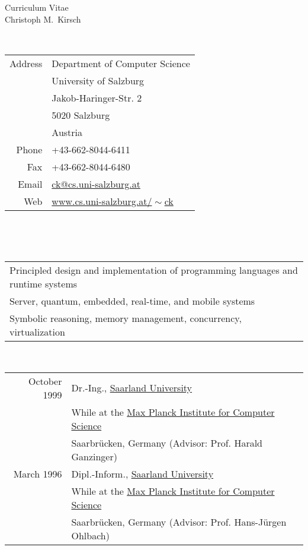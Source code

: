 \thispagestyle{empty}

\begin{center}
  {\sc \Huge Curriculum Vitae}\\ \vspace{10mm}
  {\sc \Large Christoph M.~Kirsch}\\ \vspace{12mm}
\end{center} \vfill

 \\
\begin{tabular}{rl}
Address & Department of Computer Science\\
        & University of Salzburg\\
        & Jakob-Haringer-Str. 2\\
        & 5020 Salzburg\\
        & Austria\\
\noalign{\smallskip}
Phone   & +43-662-8044-6411\\
Fax     & +43-662-8044-6480\\
Email   & \href{mailto:ck@cs.uni-salzburg.at}{ck@cs.uni-salzburg.at} \\
Web     & \href{https://www.cs.uni-salzburg.at/~ck}{www.cs.uni-salzburg.at/$\!\sim$ck} \\
\end{tabular} \\ \vfill

 \\
\begin{tabular}{l}
Principled design and implementation of programming languages and runtime systems \\
\noalign{\smallskip}
Server, quantum, embedded, real-time, and mobile systems \\
\noalign{\smallskip}
Symbolic reasoning, memory management, concurrency, virtualization
\end{tabular} \vfill

 \\
\begin{tabular}{rl}
October 1999 & Dr.-Ing., \href{http://www.uni-saarland.de}{Saarland University} \\
             & While at the \href{http://www.mpi-sb.mpg.de}{Max Planck Institute for Computer Science} \\
             & Saarbr{\"u}cken, Germany (Advisor: Prof. Harald Ganzinger)\\
\noalign{\smallskip}
March 1996 & Dipl.-Inform., \href{http://www.uni-saarland.de}{Saarland University} \\
           & While at the \href{http://www.mpi-sb.mpg.de}{Max Planck Institute for Computer Science} \\
           & Saarbr{\"u}cken, Germany (Advisor: Prof. Hans-J{\"u}rgen Ohlbach)\\
\end{tabular} \\ \vfill

